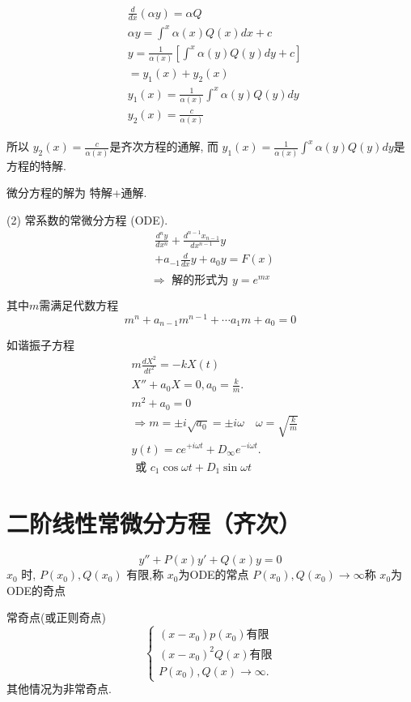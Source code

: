 $$
\begin{aligned}
& \frac{d}{d x}(\alpha y)=\alpha Q \\
& \alpha y=\int^x \alpha(x) Q(x) d x+c \\
& y=\frac{1}{\alpha(x)}\left[\int^x \alpha(y) Q(y) d y+c\right] \\
& =y_1(x)+y_2(x) \\
& y_1(x)=\frac{1}{\alpha(x)} \int^x \alpha(y) Q(y) d y \\
& y_2(x)=\frac{c}{\alpha(x)}
\end{aligned}
$$

所以
$y_2(x)=\frac{c}{\alpha(x)}$是齐次方程的通解,
而 $y_1(x)=\frac{1}{\alpha(x)} \int^x \alpha(y) Q(y) d y$是方程的特解.

微分方程的解为
特解+通解.


(2) 常系数的常微分方程 (ODE).
$$
\begin{aligned}
& \frac{d^n y}{d x^n}+\frac{d^{n-1} x_{n-1}}{d x^{n-1}} y \\
& +a_{-1} \frac{d}{d x} y+a_0 y=F(x) \\
&
\end{aligned}
$$
$$
\Rightarrow \text { 解的形式为 } y=e^{m x}
$$

其中$m$需满足代数方程
$$
m^n+a_{n-1} m^{n-1}+\cdots a_1 m+a_0=0
$$

如谐振子方程
$$
\begin{aligned}
& m \frac{d X^2}{d t^2}=-k X(t) \\
& X''+a_0 X=0, a_0=\frac{k}{m} . \\
& m^2+a_0=0 \\
& \Rightarrow m= \pm i \sqrt{a_0}= \pm i \omega \quad \omega=\sqrt{\frac{k}{m}} \\
& y(t)=c e^{+i \omega t}+D_{\infty} e^{-i \omega t} . \\
& \text { 或 } c_1 \cos \omega t+D_1 \sin \omega t
\end{aligned}
$$


\section{二阶线性常微分方程（齐次）}
$$
y''+P(x) y '+Q(x) y=0
$$
$x_0$ 时, $P\left(x_0\right), Q\left(x_0\right)$ 有限,称 $x_0$为ODE的常点
$P\left(x_0\right), Q\left(x_0\right) \rightarrow \infty$称 $x_0$为ODE的奇点

常奇点(或正则奇点) $$\left\{\begin{array}{l}
    \left(x-x_0\right) p\left(x_0\right) \text{有限}
    \\
    \left(x-x_0\right)^2 Q(x) \text{有限}
    \\ P\left(x_0\right), Q(x) \rightarrow \infty .\end{array}
    \right.$$
其他情况为非常奇点.


